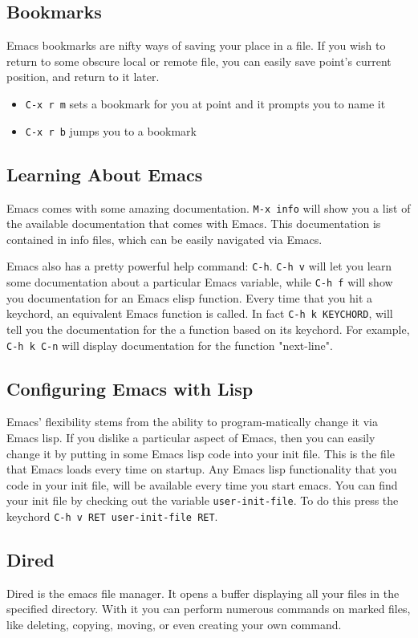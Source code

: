 \documentclass[11pt]{article}
\begin{document}
\subsection{Bookmarks}
\label{sec:orgheadline8}
Emacs bookmarks are nifty ways of saving your place in a file.  If you wish to return to some obscure local or remote file, you can easily save point's current position, and return to it later.

\begin{itemize}
\item \texttt{C-x r m}  sets a bookmark for you at point and it prompts you to name it
\item \texttt{C-x r b}  jumps you to a bookmark
\end{itemize}
\subsection{Learning About Emacs}
\label{sec:orgheadline9}
Emacs comes with some amazing documentation.  \texttt{M-x info} will show you a list of the available documentation that comes with Emacs.  This documentation is contained in info files, which can be easily navigated via Emacs.

Emacs also has a pretty powerful help command:  \texttt{C-h}.  \texttt{C-h v} will let you learn some documentation about a particular Emacs variable, while \texttt{C-h f} will show you documentation for an Emacs elisp function.  Every time that you hit a keychord, an equivalent Emacs function is called.  In fact \texttt{C-h k KEYCHORD}, will tell you the documentation for the a function based on its keychord.  For example, \texttt{C-h k C-n} will display documentation for the function "next-line".

\subsection{Configuring Emacs with Lisp}
\label{sec:orgheadline10}
Emacs' flexibility stems from the ability to program-matically change it via Emacs lisp.  If you dislike a particular aspect of Emacs, then you can easily change it by putting in some Emacs lisp code into your init file.  This is the file that Emacs loads every time on startup.  Any Emacs lisp functionality that you code in your init file, will be available every time you start emacs. You can find your init file by checking out the variable \texttt{user-init-file}.  To do this press the keychord \texttt{C-h v RET user-init-file RET}.
\subsection{Dired}
\label{sec:orgheadline13}
Dired is the emacs file manager.  It opens a buffer displaying all your files in the specified directory.  With it you can perform numerous commands on marked files, like deleting, copying, moving, or even creating your own command.
\end{document}
